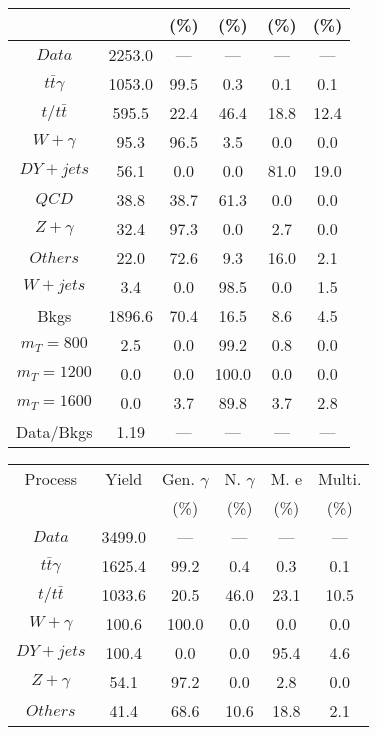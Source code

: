 \begin{figure}
\begin{minipage}[c]{0.32\textwidth}
{\begin{tabular}{cccccc}
 &  & (\%) & (\%) & (\%) & (\%)  \\
\hline
                                                                      $ Data $ &  2253.0 &  --- &  --- &  --- &  ---\\
$ t\bar{t}\gamma $ &  1053.0 &  99.5 &  0.3 &  0.1 &  0.1\\
$ t/t\bar{t} $ &  595.5 &  22.4 &  46.4 &  18.8 &  12.4\\
$ W+\gamma $ &  95.3 &  96.5 &  3.5 &  0.0 &  0.0\\
$ DY+jets $ &  56.1 &  0.0 &  0.0 &  81.0 &  19.0\\
$ QCD $ &  38.8 &  38.7 &  61.3 &  0.0 &  0.0\\
$ Z+\gamma $ &  32.4 &  97.3 &  0.0 &  2.7 &  0.0\\
$ Others $ &  22.0 &  72.6 &  9.3 &  16.0 &  2.1\\
$ W+jets $ &  3.4 &  0.0 &  98.5 &  0.0 &  1.5\\
Bkgs &  1896.6 &  70.4 &  16.5 &  8.6 &  4.5\\
$ m_{T} = 800 $ &  2.5 &  0.0 &  99.2 &  0.8 &  0.0\\
$ m_{T} = 1200 $ &  0.0 &  0.0 &  100.0 &  0.0 &  0.0\\
$ m_{T} = 1600 $ &  0.0 &  3.7 &  89.8 &  3.7 &  2.8\\
Data/Bkgs &  1.19 &  --- &  --- &  --- &  ---\\
\hline
\end{tabular}
}
\end{minipage}
\begin{minipage}[c]{0.32\textwidth}
\centering
\tiny{
\begin{tabular}{cccccc}
\hline
Process & Yield & Gen. $\gamma$ & N. $\gamma$ & M. e & Multi. \\
 &  & (\%) & (\%) & (\%) & (\%)  \\
\hline
                                                                      $ Data $ &  3499.0 &  --- &  --- &  --- &  ---\\
$ t\bar{t}\gamma $ &  1625.4 &  99.2 &  0.4 &  0.3 &  0.1\\
$ t/t\bar{t} $ &  1033.6 &  20.5 &  46.0 &  23.1 &  10.5\\
$ W+\gamma $ &  100.6 &  100.0 &  0.0 &  0.0 &  0.0\\
$ DY+jets $ &  100.4 &  0.0 &  0.0 &  95.4 &  4.6\\
$ Z+\gamma $ &  54.1 &  97.2 &  0.0 &  2.8 &  0.0\\
$ Others $ &  41.4 &  68.6 &  10.6 &  18.8 &  2.1\\

\end{tabular}}
\end{minipage}
\end{figure}
